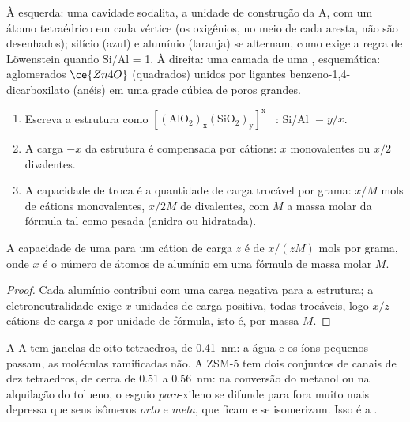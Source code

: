 \begin{omfigure}
{\small À esquerda: uma cavidade sodalita, a unidade de construção da  A, com um
átomo tetraédrico em cada vértice (os oxigênios, no meio de cada aresta, não são
desenhados); silício (azul) e alumínio (laranja) se alternam, como exige a regra de
Löwenstein quando Si/Al = 1. À direita: uma camada de uma ,
esquemática: aglomerados $\ce{Zn4O}$ (quadrados) unidos por ligantes benzeno-1,4-dicarboxilato
(anéis) em uma grade cúbica de poros grandes.}
\end{omfigure}

\begin{method}\label{met:b3:inorganic-materials:zeolite-formula}
\begin{enumerate}
  \item Escreva a estrutura como $\mathrm{[(AlO_2)_x(SiO_2)_y]^{x-}}$: Si/Al $= y/x$.
  \item A carga $-x$ da estrutura é compensada por cátions: $x$ monovalentes ou $x/2$
        divalentes.
  \item A capacidade de troca é a quantidade de carga trocável por grama:
        $x/M$ mols de cátions monovalentes, $x/2M$ de divalentes, com $M$ a
        massa molar da fórmula tal como pesada (anidra ou hidratada).
\end{enumerate}
\end{method}

\begin{proposition}\label{prop:b3:inorganic-materials:exchange-capacity}
A capacidade de uma  para um cátion de carga $z$ é de $x/(zM)$ mols por grama,
onde $x$ é o número de átomos de alumínio em uma fórmula de massa molar $M$.
\end{proposition}

\begin{proof}
Cada alumínio contribui com uma carga negativa para a estrutura; a
eletroneutralidade exige $x$ unidades de carga positiva, todas trocáveis, logo
$x/z$ cátions de carga $z$ por unidade de fórmula, isto é, por massa $M$.
\end{proof}

A  A tem janelas de oito tetraedros, de \qty{0.41}{nm}: a água e os íons
pequenos passam, as moléculas ramificadas não. A ZSM-5 tem dois conjuntos de canais de dez
tetraedros, de cerca de 0.51 a \qty{0.56}{nm}: na conversão do metanol ou na
alquilação do tolueno, o esguio \textit{para}-xileno se difunde para fora muito mais depressa que
seus isômeros \textit{orto} e \textit{meta}, que ficam e se isomerizam. Isso é a .

